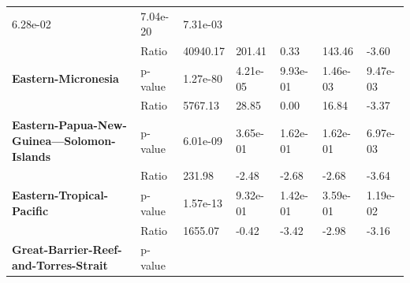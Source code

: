 \begin{table}[H]
{\begin{tabular}{lllllll}
            6.28e-02                                            & 7.04e-20 &
            7.31e-03
            \\
            \textbf{}                                           & Ratio    &
            40940.17                                            & 201.41   &
            0.33
                                                                & 143.46   &
            -3.60
            \\
            \textbf{Eastern-Micronesia}                         & p-value  &
            1.27e-80                                            & 4.21e-05 &
            9.93e-01                                            & 1.46e-03 &
            9.47e-03
            \\
            \textbf{}                                           & Ratio    &
            5767.13                                             & 28.85    &
            0.00
                                                                & 16.84    &
            -3.37
            \\
            \textbf{Eastern-Papua-New-Guinea---Solomon-Islands} &
            p-value                                             &
            6.01e-09                                            &
            3.65e-01                                            &
            1.62e-01                                            &
            1.62e-01                                            &
            6.97e-03
            \\
            \textbf{}                                           & Ratio    &
            231.98                                              & -2.48    &
            -2.68
                                                                & -2.68    &
            -3.64
            \\
            \textbf{Eastern-Tropical-Pacific}                   & p-value  &
            1.57e-13                                            & 9.32e-01 &
            1.42e-01                                            & 3.59e-01 &
            1.19e-02
            \\
            \textbf{}                                           & Ratio    &
            1655.07                                             & -0.42    &
            -3.42
                                                                & -2.98    &
            -3.16
            \\
            \textbf{Great-Barrier-Reef-and-Torres-Strait}       &
            p-value                                             &

\end{tabular}}
\end{table}
